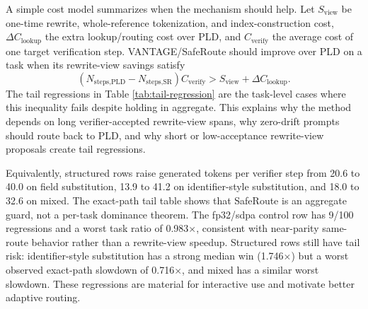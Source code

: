 \documentclass[11pt,a4paper]{article}
\begin{document}
A simple cost model summarizes when the mechanism should help. Let
$S_{\text{view}}$ be one-time rewrite, whole-reference tokenization, and
index-construction cost, $\Delta C_{\text{lookup}}$ the extra lookup/routing
cost over PLD, and $C_{\text{verify}}$ the average cost of one target
verification step. VANTAGE/SafeRoute should improve over PLD on a task when its rewrite-view
savings satisfy
\[
(N_{\text{steps,PLD}}-N_{\text{steps,SR}})C_{\text{verify}}
>
S_{\text{view}}+\Delta C_{\text{lookup}}.
\]
The tail regressions in Table \ref{tab:tail-regression} are the task-level
cases where this inequality fails despite holding in aggregate.
This explains why the method depends on long verifier-accepted rewrite-view
spans, why zero-drift prompts should route back to PLD, and why short or
low-acceptance rewrite-view proposals create tail regressions.

\begin{table}[h]
\centering\scriptsize
\caption{Mechanism counters from the Qwen-base fp32/sdpa exact-path
$n=100$ validation. Verifier steps count logged decode/verification steps
under the shared root/catch-up convention, not raw GPU kernel launches.
RewriteView hits count selected rewrite-view proposals; accepted/hit
counts accepted non-root tokens from those hits. In route counts, ``no draft''
denotes decode steps with no selected non-root draft beyond the verified root.}
\label{tab:frozen-systems}
\end{table}

Equivalently, structured rows raise generated tokens per verifier step from
20.6 to 40.0 on field substitution, 13.9 to 41.2 on identifier-style
substitution, and 18.0 to 32.6 on mixed.
The exact-path tail table shows that SafeRoute is an aggregate guard, not a
per-task dominance theorem. The fp32/sdpa control row has 9/100 regressions
and a worst task ratio of 0.983$\times$, consistent with
near-parity same-route behavior rather than a rewrite-view speedup.
Structured rows still have tail risk: identifier-style substitution has a
strong median win (1.746$\times$) but a worst observed exact-path slowdown of
0.716$\times$, and mixed has a similar worst slowdown. These regressions are
material for interactive use and motivate better adaptive routing.
\end{document}
